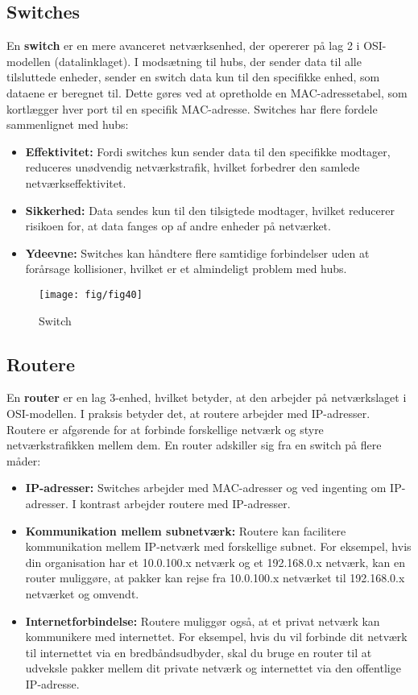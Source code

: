 \subsection{Switches}
En \textbf{switch} er en mere avanceret netværksenhed, der opererer på lag 2 i OSI-modellen (datalinklaget). I modsætning til hubs, der sender data til alle tilsluttede enheder, sender en switch data kun til den specifikke enhed, som dataene er beregnet til. Dette gøres ved at opretholde en MAC-adressetabel, som kortlægger hver port til en specifik MAC-adresse.
\newline
\newline
\noindent Switches har flere fordele sammenlignet med hubs:
\begin{itemize}
	\item \textbf{Effektivitet:} Fordi switches kun sender data til den specifikke modtager, reduceres unødvendig netværkstrafik, hvilket forbedrer den samlede netværkseffektivitet.
	\item \textbf{Sikkerhed:} Data sendes kun til den tilsigtede modtager, hvilket reducerer risikoen for, at data fanges op af andre enheder på netværket.
	\item \textbf{Ydeevne:} Switches kan håndtere flere samtidige forbindelser uden at forårsage kollisioner, hvilket er et almindeligt problem med hubs.
\end{itemize}
\begin{figure}[!h]
	\centering
	\texttt{[image: fig/fig40]}
	\caption{Switch}
\end{figure}

\subsection{Routere}
En \textbf{router} er en lag 3-enhed, hvilket betyder, at den arbejder på netværkslaget i OSI-modellen. I praksis betyder det, at routere arbejder med IP-adresser. Routere er afgørende for at forbinde forskellige netværk og styre netværkstrafikken mellem dem. En router adskiller sig fra en switch på flere måder:
\begin{itemize}
	\item \textbf{IP-adresser:} Switches arbejder med MAC-adresser og ved ingenting om IP-adresser. I kontrast arbejder routere med IP-adresser.
	\item \textbf{Kommunikation mellem subnetværk:} Routere kan facilitere kommunikation mellem IP-netværk med forskellige subnet. For eksempel, hvis din organisation har et 10.0.100.x netværk og et 192.168.0.x netværk, kan en router muliggøre, at pakker kan rejse fra 10.0.100.x netværket til 192.168.0.x netværket og omvendt.
	\item \textbf{Internetforbindelse:} Routere muliggør også, at et privat netværk kan kommunikere med internettet. For eksempel, hvis du vil forbinde dit netværk til internettet via en bredbåndsudbyder, skal du bruge en router til at udveksle pakker mellem dit private netværk og internettet via den offentlige IP-adresse.
\end{itemize}

